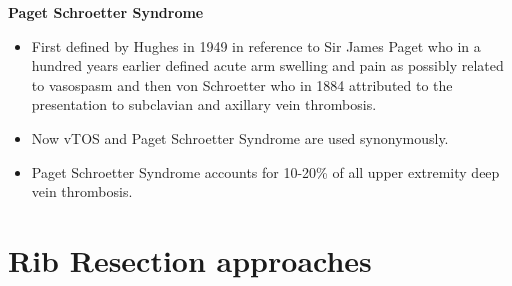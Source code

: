 \documentclass[
]{book}
\begin{document}
\textbf{Paget Schroetter Syndrome}

\begin{itemize}
\item
  First defined by Hughes in 1949 in reference to Sir James Paget who
  in a hundred years earlier defined acute arm swelling and pain as
  possibly related to vasospasm and then von Schroetter who in 1884
  attributed to the presentation to subclavian and axillary vein
  thrombosis. \citet{humphries123ThoracicOutlet2019}
\item
  Now vTOS and Paget Schroetter Syndrome are used synonymously.
\item
  Paget Schroetter Syndrome accounts for 10-20\% of all upper extremity
  deep vein thrombosis. \citet{sekharYearbookVascularEndovascular2018}
\end{itemize}

\hypertarget{rib-resection-approaches}{%
\section{Rib Resection approaches}\label{rib-resection-approaches}}
\end{document}
